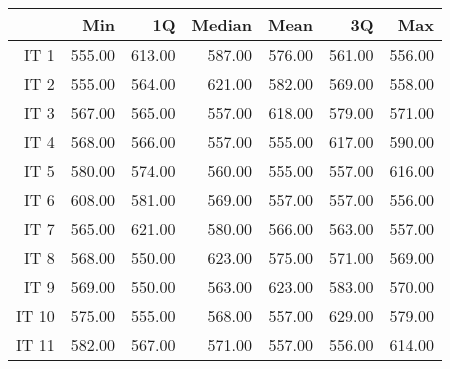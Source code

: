 \begin{table}[ht]
\centering
\begin{tabular}{rrrrrrr}
  \hline
 & Min & 1Q & Median & Mean & 3Q & Max \\ 
  \hline
IT 1 & 555.00 & 613.00 & 587.00 & 576.00 & 561.00 & 556.00 \\ 
  IT 2 & 555.00 & 564.00 & 621.00 & 582.00 & 569.00 & 558.00 \\ 
  IT 3 & 567.00 & 565.00 & 557.00 & 618.00 & 579.00 & 571.00 \\ 
  IT 4 & 568.00 & 566.00 & 557.00 & 555.00 & 617.00 & 590.00 \\ 
  IT 5 & 580.00 & 574.00 & 560.00 & 555.00 & 557.00 & 616.00 \\ 
  IT 6 & 608.00 & 581.00 & 569.00 & 557.00 & 557.00 & 556.00 \\ 
  IT 7 & 565.00 & 621.00 & 580.00 & 566.00 & 563.00 & 557.00 \\ 
  IT 8 & 568.00 & 550.00 & 623.00 & 575.00 & 571.00 & 569.00 \\ 
  IT 9 & 569.00 & 550.00 & 563.00 & 623.00 & 583.00 & 570.00 \\ 
  IT 10 & 575.00 & 555.00 & 568.00 & 557.00 & 629.00 & 579.00 \\ 
  IT 11 & 582.00 & 567.00 & 571.00 & 557.00 & 556.00 & 614.00 \\ 
   \hline
\end{tabular}
\end{table}
